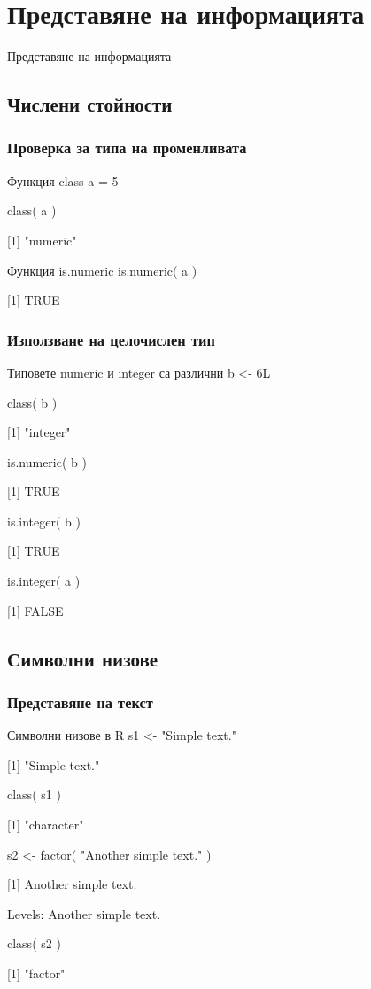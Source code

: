 \documentclass{beamer}
\begin{document}
\section{Представяне на информацията}

\begin{frame}
\center \huge{Представяне на информацията}
\end{frame}

\subsection{Числени стойности}

\begin{frame}
\frametitle{Проверка за типа на променливата}
\begin{block}{Функция class}
a = 5

class( a )

[1] "numeric"
\end{block}

\begin{block}{Функция is.numeric}
is.numeric( a )

[1] TRUE
\end{block}
\end{frame}

\begin{frame}
\frametitle{Използване на целочислен тип}
\begin{block}{Типовете numeric и integer са различни}
b <- 6L

class( b )

[1] "integer"

is.numeric( b )

[1] TRUE

is.integer( b )

[1] TRUE

is.integer( a )

[1] FALSE
\end{block}
\end{frame}

\subsection{Символни низове}

\begin{frame}
\frametitle{Представяне на текст}
\begin{block}{Символни низове в R}
s1 <- "Simple text."

[1] "Simple text."

class( s1 )

[1] "character"

s2 <- factor( "Another simple text." )

[1] Another simple text.

Levels: Another simple text.

class( s2 )

[1] "factor"
\end{block}
\end{frame}
\end{document}
